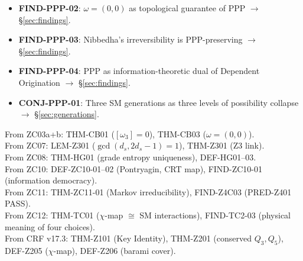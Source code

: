 \documentclass[12pt, a4paper]{article}
\begin{document}
\begin{formalbox}[title={Atomic units introduced by TASK-ZC13}]
\begin{itemize}[leftmargin=*]
    $\to$ \S\ref{sec:findings}.
  \item \textbf{FIND-PPP-02}: $\omega = (0,0)$ as topological
    guarantee of PPP $\to$ \S\ref{sec:findings}.
  \item \textbf{FIND-PPP-03}: Nibbedha's irreversibility is
    PPP-preserving $\to$ \S\ref{sec:findings}.
  \item \textbf{FIND-PPP-04}: PPP as information-theoretic dual of
    Dependent Origination $\to$ \S\ref{sec:findings}.
  \item \textbf{CONJ-PPP-01}: Three SM generations as three levels
    of possibility collapse $\to$ \S\ref{sec:generations}.
\end{itemize}
\end{formalbox}

\begin{formalbox}[title={Atomic units inherited (not modified)}]
From ZC03a+b: THM-CB01 ($[\omega_3]=0$), THM-CB03
  ($\omega=(0,0)$). \\
From ZC07: LEM-Z301 ($\gcd(d_s,2d_s-1)=1$), THM-Z301 (Z3 link). \\
From ZC08: THM-HG01 (grade entropy uniqueness), DEF-HG01--03. \\
From ZC10: DEF-ZC10-01--02 (Pontryagin, CRT map),
  FIND-ZC10-01 (information democracy). \\
From ZC11: THM-ZC11-01 (Markov irreducibility),
  FIND-Z4C03 (PRED-Z401 PASS). \\
From ZC12: THM-TC01 ($\chi$-map $\cong$ SM interactions),
  FIND-TC2-03 (physical meaning of four choices). \\
From CRF v17.3: THM-Z101 (Key Identity), THM-Z201
  (conserved $Q_3, Q_5$), DEF-Z205 ($\chi$-map),
  DEF-Z206 (barami cover).
\end{formalbox}
\end{document}
